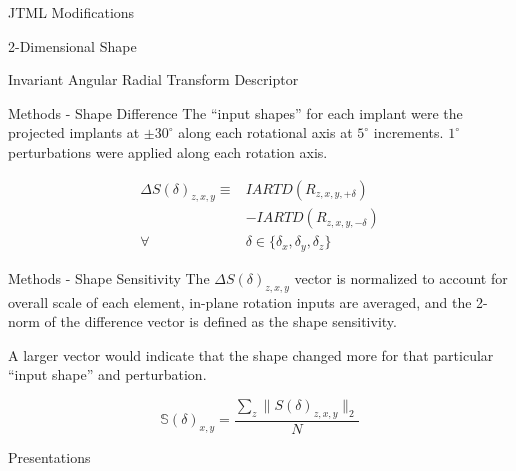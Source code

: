 \documentclass[presentation, aspectratio=1610]{beamer}
\begin{document}
\begin{frame}[label={sec:orgb202fa4}]{JTML Modifications}
\end{frame}
\begin{frame}[label={sec:org7f942db}]{2-Dimensional Shape}
\end{frame}
\begin{frame}[label={sec:org38233e1}]{Invariant Angular Radial Transform Descriptor}
\end{frame}
\begin{frame}[label={sec:org689eb2f}]{Methods - Shape Difference}
The ``input shapes'' for each implant were the projected implants at \(\pm 30^{\circ}\) along each rotational axis at \(5^{\circ}\) increments.
\(1^{\circ}\) perturbations were applied along each rotation axis.

\begin{equation}
	\label{eq:shape-derivative}
	\begin{split}
		\Delta S(\delta)_{z,x,y}  \equiv & IARTD(R_{z,x,y,+\delta})                        \\
		                                 & - IARTD(R_{z,x,y,-\delta})                      \\
		\forall                          & \delta \in \{\delta_{x},\delta_{y},\delta_{z}\}
	\end{split}
\end{equation}
\end{frame}
\begin{frame}[label={sec:org5751afc}]{Methods - Shape Sensitivity}
The \(\Delta S(\delta)_{z,x,y}\) vector is normalized to account for overall scale of each element, in-plane rotation inputs are averaged, and the 2-norm of the difference vector is defined as the shape sensitivity.

A larger vector would indicate that the shape changed more for that particular ``input shape'' and perturbation.

\begin{equation}
	\label{eq:z_rot_norm}
	\mathbb{S}(\delta)_{x,y} = \dfrac{\sum_{z} \| S(\delta)_{z,x,y} \|_{2}}{N}
\end{equation}
\end{frame}
\begin{frame}[label={sec:org3d413b0},fragile, allowframebreaks, label=]{Presentations}
\begin{refsection}
  
  \printbibliography[title=Presentations]
\end{refsection}
\end{frame}
\end{document}
